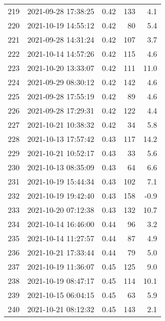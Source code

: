 \begin{tabular}{llrrr}
219 & 2021-09-28 17:38:25 &  0.42 &             133 &                    4.1 \\
220 & 2021-10-19 14:55:12 &  0.42 &              80 &                    5.4 \\
221 & 2021-09-28 14:31:24 &  0.42 &             107 &                    3.7 \\
222 & 2021-10-14 14:57:26 &  0.42 &             115 &                    4.6 \\
223 & 2021-10-20 13:33:07 &  0.42 &             111 &                   11.0 \\
224 & 2021-09-29 08:30:12 &  0.42 &             142 &                    4.6 \\
225 & 2021-09-28 17:55:19 &  0.42 &              89 &                    4.6 \\
226 & 2021-09-28 17:29:31 &  0.42 &             122 &                    4.4 \\
227 & 2021-10-21 10:38:32 &  0.42 &              34 &                    5.8 \\
228 & 2021-10-13 17:57:42 &  0.43 &             117 &                   14.2 \\
229 & 2021-10-21 10:52:17 &  0.43 &              33 &                    5.6 \\
230 & 2021-10-13 08:35:09 &  0.43 &              64 &                    6.6 \\
231 & 2021-10-19 15:44:34 &  0.43 &             102 &                    7.1 \\
232 & 2021-10-19 19:42:40 &  0.43 &             158 &                   -0.9 \\
233 & 2021-10-20 07:12:38 &  0.43 &             132 &                   10.7 \\
234 & 2021-10-14 16:46:00 &  0.44 &              96 &                    3.2 \\
235 & 2021-10-14 11:27:57 &  0.44 &              87 &                    4.9 \\
236 & 2021-10-21 17:33:44 &  0.44 &              79 &                    5.0 \\
237 & 2021-10-19 11:36:07 &  0.45 &             125 &                    9.0 \\
238 & 2021-10-19 08:47:17 &  0.45 &             114 &                   10.1 \\
239 & 2021-10-15 06:04:15 &  0.45 &              63 &                    5.9 \\
240 & 2021-10-21 08:12:32 &  0.45 &             143 &                    2.1 \\

\end{tabular}
